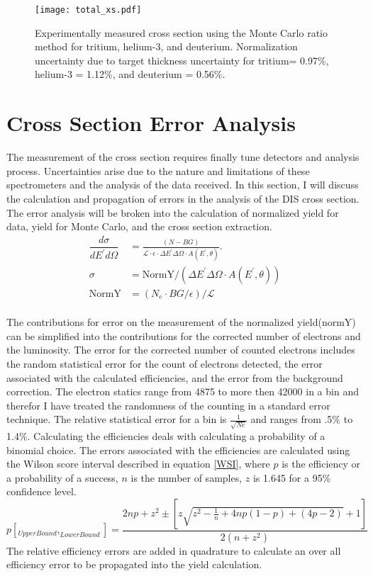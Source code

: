 \begin{figure}
	\hspace{-80pt}
	\texttt{[image: total\_xs.pdf]}
	\caption{Experimentally measured cross section using the Monte Carlo ratio method for tritium, helium-3, and deuterium. Normalization uncertainty due to target thickness uncertainty for tritium= 0.97\%, helium-3 = 1.12\%, and deuterium = 0.56\%. \label{CCplot}}
\end{figure}

\section{Cross Section Error Analysis}
The measurement of the cross section requires finally tune detectors and analysis process. Uncertainties arise due to the nature and limitations of these spectrometers and the analysis of the data received. In this section, I will discuss the calculation and propagation of errors in the analysis of the DIS cross section. The error analysis will be broken into the calculation of normalized yield for data, yield for Monte Carlo, and the cross section extraction. 
\begin{align}
\dfrac{d\sigma}{dE^{\prime}d\Omega} &= \frac{(N - BG)}{\mathscr{L} \cdot \epsilon \cdot \Delta E^{\prime} \Delta \Omega \cdot A(E^{\prime},\theta)}. \nonumber\\
\sigma &= \text{NormY}/\left(\Delta E^{\prime} \Delta \Omega \cdot A(E^{\prime},\theta)\right)\nonumber\\
\text{NormY} &= \left(N_e \cdot BG/\epsilon \right) / \mathscr{L}
\end{align}
\paragraph{}
The contributions for error on the measurement of the normalized yield(normY) can be simplified into the contributions for the corrected number of electrons and the luminosity. The error for the corrected number of counted electrons includes the random statistical error for the count of electrons detected, the error associated with the calculated efficiencies, and the error from the background correction. The electron statics range from 4875 to more then 42000 in a bin and therefor I have treated the randomness of the counting in a standard error technique. The relative statistical error for a bin is $\frac{1}{\sqrt{Ne}}$ and ranges from .5\% to 1.4\%. Calculating the efficiencies deals with calculating a probability of a binomial choice. The errors associated with the efficiencies are calculated using the Wilson score interval described in equation \ref{WSI}, where $p$ is the efficiency or a probability of a success, $n$ is the number of samples, $z$ is 1.645 for a 95\% confidence level. 
\begin{equation}
p[_{UpperBound},_{LowerBound}] = \frac{ 2np +z^2 \pm \left[z\sqrt{z^2 - \frac{1}{n} + 4np(1-p) +(4p-2)} + 1 \right]}{2(n+z^2)} \label{WSI}
\end{equation}
The relative efficiency errors are added in quadrature to calculate an over all efficiency error to be propagated into the yield calculation.
